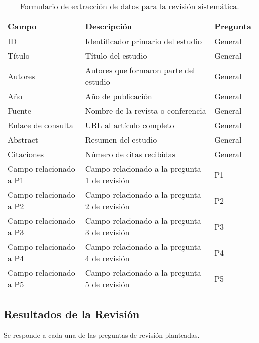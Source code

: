 \begin{table}[h!]
      \centering
      {\footnotesize
            \begin{tabular}{|p{4cm}|p{9cm}|l|}
                  \hline
                  \textbf{Campo}         & \textbf{Descripción}                          & \textbf{Pregunta} \\ \hline
                  ID                     & Identificador primario del estudio            & General           \\ \hline
                  Título                 & Título del estudio                            & General           \\ \hline
                  Autores                & Autores que formaron parte del estudio        & General           \\ \hline
                  Año                    & Año de publicación                            & General           \\ \hline
                  Fuente                 & Nombre de la revista o conferencia            & General           \\ \hline
                  Enlace de consulta     & URL al artículo completo                      & General           \\ \hline
                  Abstract               & Resumen del estudio                           & General           \\ \hline
                  Citaciones             & Número de citas recibidas                     & General           \\ \hline
                  Campo relacionado a P1 & Campo relacionado a la pregunta 1 de revisión & P1                \\ \hline
                  Campo relacionado a P2 & Campo relacionado a la pregunta 2 de revisión & P2                \\ \hline
                  Campo relacionado a P3 & Campo relacionado a la pregunta 3 de revisión & P3                \\ \hline
                  Campo relacionado a P4 & Campo relacionado a la pregunta 4 de revisión & P4                \\ \hline
                  Campo relacionado a P5 & Campo relacionado a la pregunta 5 de revisión & P5                \\ \hline
            \end{tabular}
      }
      \caption{Formulario de extracción de datos para la revisión sistemática.}
      \label{tab:formulario-extraccion}
\end{table}

\subsection{Resultados de la Revisión}
\label{subsec:resultados-revision}

Se responde a cada una de las preguntas de revisión planteadas.